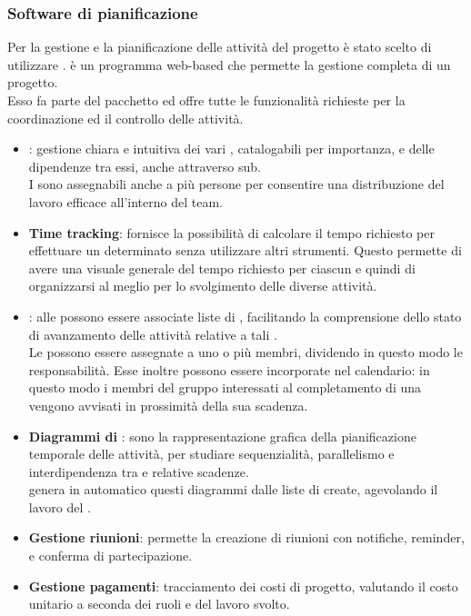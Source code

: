 \subsubsection{Software di pianificazione} \label{sec:teamwork}
Per la gestione e la pianificazione delle attività del progetto è stato scelto di utilizzare \textbf{}.  è un programma web-based che permette la gestione completa di un progetto.\\
Esso fa parte del pacchetto  ed offre tutte le funzionalità richieste per la coordinazione ed il controllo delle attività.
\begin{itemize}
	\item \textbf{}:
	gestione chiara e intuitiva dei vari , catalogabili per importanza, e delle dipendenze tra essi, anche attraverso sub.\\
	I  sono assegnabili anche a più persone per consentire una distribuzione del lavoro efficace all'interno del team.
	
	\item \textbf{Time tracking}:
	 fornisce la possibilità di calcolare il tempo richiesto per effettuare un determinato  senza utilizzare altri strumenti. Questo permette di avere una visuale generale del tempo richiesto per ciascun  e quindi di organizzarsi al meglio per lo svolgimento delle diverse attività.
	
	\item \textbf{}:
	alle  possono essere associate liste di , facilitando la comprensione dello stato di avanzamento delle attività relative a tali .\\
	Le  possono essere assegnate a uno o più membri, dividendo in questo modo le responsabilità. Esse inoltre possono essere incorporate nel calendario: in questo modo i membri del gruppo interessati al completamento di una  vengono avvisati in prossimità della sua scadenza.
	
	\item \textbf{Diagrammi di }:	
	sono la rappresentazione grafica della pianificazione temporale delle attività, per studiare sequenzialità, parallelismo e interdipendenza tra  e relative scadenze.\\
	 genera in automatico questi diagrammi dalle liste di  create, agevolando il lavoro del \Responsabile.
	
	\item \textbf{Gestione riunioni}:
	 permette la creazione di riunioni con notifiche, reminder, e conferma di partecipazione.
	
	\item \textbf{Gestione pagamenti}:
	tracciamento dei costi di progetto, valutando il costo unitario a seconda dei ruoli e del lavoro svolto.
\end{itemize}

